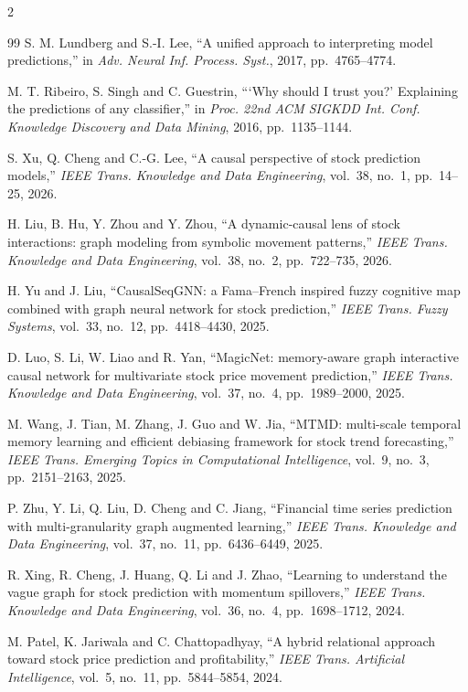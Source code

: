 \begin{footnotesize}
\begin{multicols}{2}
\begin{thebibliography}{99}
 S. M. Lundberg and S.-I. Lee, ``A unified approach to interpreting
model predictions,'' in \emph{Adv. Neural Inf. Process. Syst.}, 2017, pp.~4765--4774.

 M. T. Ribeiro, S. Singh and C. Guestrin, ```Why should I trust you?'
Explaining the predictions of any classifier,'' in \emph{Proc. 22nd ACM SIGKDD Int. Conf.
Knowledge Discovery and Data Mining}, 2016, pp.~1135--1144.

 S. Xu, Q. Cheng and C.-G. Lee, ``A causal perspective of stock
prediction models,'' \emph{IEEE Trans. Knowledge and Data Engineering}, vol.~38, no.~1,
pp.~14--25, 2026.

 H. Liu, B. Hu, Y. Zhou and Y. Zhou, ``A dynamic-causal lens of
stock interactions: graph modeling from symbolic movement patterns,'' \emph{IEEE Trans.
Knowledge and Data Engineering}, vol.~38, no.~2, pp.~722--735, 2026.

 H. Yu and J. Liu, ``CausalSeqGNN: a Fama--French inspired
fuzzy cognitive map combined with graph neural network for stock prediction,'' \emph{IEEE
Trans. Fuzzy Systems}, vol.~33, no.~12, pp.~4418--4430, 2025.

 D. Luo, S. Li, W. Liao and R. Yan, ``MagicNet: memory-aware
graph interactive causal network for multivariate stock price movement prediction,''
\emph{IEEE Trans. Knowledge and Data Engineering}, vol.~37, no.~4, pp.~1989--2000, 2025.

 M. Wang, J. Tian, M. Zhang, J. Guo and W. Jia, ``MTMD: multi-scale
temporal memory learning and efficient debiasing framework for stock trend forecasting,''
\emph{IEEE Trans. Emerging Topics in Computational Intelligence}, vol.~9, no.~3,
pp.~2151--2163, 2025.

 P. Zhu, Y. Li, Q. Liu, D. Cheng and C. Jiang, ``Financial time
series prediction with multi-granularity graph augmented learning,'' \emph{IEEE Trans.
Knowledge and Data Engineering}, vol.~37, no.~11, pp.~6436--6449, 2025.

 R. Xing, R. Cheng, J. Huang, Q. Li and J. Zhao, ``Learning to
understand the vague graph for stock prediction with momentum spillovers,'' \emph{IEEE
Trans. Knowledge and Data Engineering}, vol.~36, no.~4, pp.~1698--1712, 2024.

 M. Patel, K. Jariwala and C. Chattopadhyay, ``A hybrid
relational approach toward stock price prediction and profitability,'' \emph{IEEE Trans.
Artificial Intelligence}, vol.~5, no.~11, pp.~5844--5854, 2024.


\end{thebibliography}
\end{multicols}
\end{footnotesize}
